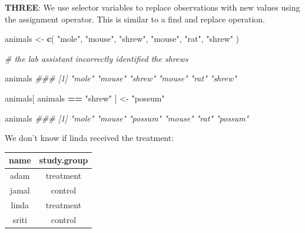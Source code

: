 \documentclass[]{book}
\newenvironment{Shaded}{\begin{snugshade}}{\end{snugshade}}
\newcommand{\CommentTok}[1]{\textcolor[rgb]{0.56,0.35,0.01}{\textit{#1}}}
\newcommand{\KeywordTok}[1]{\textcolor[rgb]{0.13,0.29,0.53}{\textbf{#1}}}
\newcommand{\NormalTok}[1]{#1}
\newcommand{\OperatorTok}[1]{\textcolor[rgb]{0.81,0.36,0.00}{\textbf{#1}}}
\newcommand{\StringTok}[1]{\textcolor[rgb]{0.31,0.60,0.02}{#1}}
\theoremstyle{definition}
\theoremstyle{definition}
\theoremstyle{definition}
\theoremstyle{remark}
\begin{document}
\textbf{THREE}: We use selector variables to replace observations with
new values using the assignment operator. This is similar to a find and
replace operation.

\begin{Shaded}
\begin{Highlighting}[]
\NormalTok{animals <-}\StringTok{ }\KeywordTok{c}\NormalTok{( }\StringTok{"mole"}\NormalTok{, }\StringTok{"mouse"}\NormalTok{, }\StringTok{"shrew"}\NormalTok{, }\StringTok{"mouse"}\NormalTok{, }\StringTok{"rat"}\NormalTok{, }\StringTok{"shrew"}\NormalTok{ )}

\CommentTok{# the lab assistant incorrectly identified the shrews}

\NormalTok{animals}
\CommentTok{### [1] "mole"  "mouse" "shrew" "mouse" "rat"   "shrew"}

\NormalTok{animals[ animals }\OperatorTok{==}\StringTok{ "shrew"}\NormalTok{ ] <-}\StringTok{ "possum"}

\NormalTok{animals}
\CommentTok{### [1] "mole"   "mouse"  "possum" "mouse"  "rat"    "possum"}
\end{Highlighting}
\end{Shaded}

We don't know if linda received the treatment:

\begin{longtable}[]{@{}cc@{}}
\toprule
\begin{minipage}[b]{0.10\columnwidth}\centering
name\strut
\end{minipage} & \begin{minipage}[b]{0.18\columnwidth}\centering
study.group\strut
\end{minipage}\tabularnewline
\midrule
\endhead
\begin{minipage}[t]{0.10\columnwidth}\centering
adam\strut
\end{minipage} & \begin{minipage}[t]{0.18\columnwidth}\centering
treatment\strut
\end{minipage}\tabularnewline
\begin{minipage}[t]{0.10\columnwidth}\centering
jamal\strut
\end{minipage} & \begin{minipage}[t]{0.18\columnwidth}\centering
control\strut
\end{minipage}\tabularnewline
\begin{minipage}[t]{0.10\columnwidth}\centering
linda\strut
\end{minipage} & \begin{minipage}[t]{0.18\columnwidth}\centering
treatment\strut
\end{minipage}\tabularnewline
\begin{minipage}[t]{0.10\columnwidth}\centering
sriti\strut
\end{minipage} & \begin{minipage}[t]{0.18\columnwidth}\centering
control\strut
\end{minipage}\tabularnewline
\bottomrule
\end{longtable}
\end{document}
